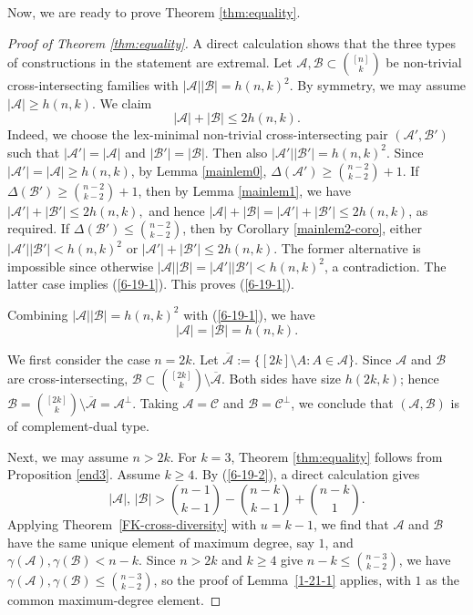 \documentclass[a4paper,11pt]{article}
\newcommand{\m}{\mathcal}
\begin{document}
Now, we are ready to prove Theorem \ref{thm:equality}. 

\begin{proof}[Proof of Theorem \ref{thm:equality}]
A direct calculation shows that the three types of constructions in the statement are extremal. 
Let $\m A, \m B\subset {[n]\choose k}$ be non-trivial cross-intersecting families with $|\m A||\m B|=h(n,k)^2$. By symmetry, we may assume $|\m A|\ge h(n,k)$. 
We claim 
\begin{equation}\label{6-19-1}
|\m A|+|\m B|\le 2h(n,k).
\end{equation}
Indeed, we choose the lex-minimal non-trivial cross-intersecting pair $(\m A', \m B')$ such that $|\m A'|=|\m A|$ and $|\m B'|=|\m B|$. Then also $|\m A'||\m B'|=h(n,k)^2$. 
Since $|\m A'|=|\m A|\ge h(n,k)$, by Lemma \ref{mainlem0}, $\Delta(\m A')\ge {n-2\choose k-2}+1$. If $\Delta(\m B')\ge {n-2\choose k-2}+1$, then by Lemma \ref{mainlem1}, we have $|\m A'|+|\m B'|\le 2h(n,k),$ and hence $|\m A|+|\m B|=|\m A'|+|\m B'|\le 2h(n,k)$, as required. If $\Delta(\m B')\le {n-2\choose k-2}$, then by Corollary \ref{mainlem2-coro}, either $|\m A'||\m B'|< h(n,k)^2$ or  $|\m A'|+|\m B'|\le 2h(n,k)$. The former alternative is impossible since otherwise $|\m A||\m B|=|\m A'||\m B'|< h(n,k)^2$, a contradiction. The latter case implies (\ref{6-19-1}). This proves (\ref{6-19-1}).  

Combining $|\m A||\m B|=h(n,k)^2$ with (\ref{6-19-1}), we have
\begin{equation}\label{6-19-2}
|\m A|=|\m B|=h(n,k).
\end{equation}

 
We first consider the case $n=2k$. Let $\overline{\m A}:=\{[2k]\setminus A:A\in \m A\}$. 
 Since $\m A$ and $\m B$ are
cross-intersecting, $\m B\subset
\binom{[2k]}k\setminus\overline{\m A}$. 
Both sides have size $h(2k,k)$; hence $\m B=
\binom{[2k]}k\setminus\overline{\m A}
=\m A^\perp.$ Taking $\m A=\m C$ and $\m B=\m C^{\perp}$, we conclude that $(\m A, \m B)$ is of complement-dual type.

Next, we may assume $n>2k$. For $k=3$, Theorem \ref{thm:equality}  follows from Proposition \ref{end3}. Assume $k\ge 4$. 
By (\ref{6-19-2}), a direct
calculation gives
\[
|\m A|,\,|\m B|>\binom{n-1}{k-1}-\binom{n-k}{k-1}+\binom{n-k}{1}.
\]
Applying Theorem~\ref{FK-cross-diversity} with $u=k-1$, we
find that $\m A$ and $\m B$ have the same unique element of
maximum degree, say $1$, and $\gamma(\m A),\gamma(\m B)<n-k$.
Since $n>2k$ and $k\ge4$ give $n-k\le\binom{n-3}{k-2}$, we
have $\gamma(\m A),\gamma(\m B)\le\binom{n-3}{k-2}$, so the
proof of Lemma~\ref{1-21-1} applies, with $1$ as the common
maximum-degree element.


\end{proof}
\end{document}
